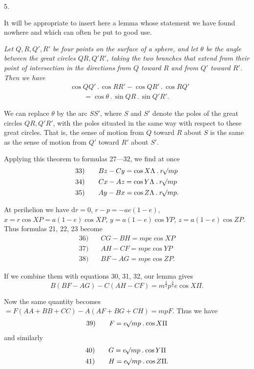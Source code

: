 \par{}\bigskip
{}
\begin{center}5.\end{center}
\noindent\hspace*{\parindent}It will be appropriate to insert here a lemma whose statement we have found nowhere and which can often be put to good use.
\par\textit{Let \(Q,R,Q',R'\) be four points on the surface of a sphere, and let \(\theta\) be the angle between the great circles \(QR,Q'R'\), taking the two branches that extend from their point of intersection in the directions from \(Q\) toward \(R\) and from \(Q'\) toward \(R'\). Then we have}
\[
\begin{aligned}
&\cos QQ'\mathbin{.}\cos RR'-\cos QR'\mathbin{.}\cos RQ'\\
&\qquad=\cos\theta\mathbin{.}\sin QR\mathbin{.}\sin Q'R'.
\end{aligned}
\]
\par We can replace \(\theta\) by the arc \(SS'\), where \(S\) and \(S'\) denote the poles of the great circles \(QR,Q'R'\), with the poles situated in the same way with respect to these great circles. That is, the sense of motion from \(Q\) toward \(R\) about \(S\) is the same as the sense of motion from \(Q'\) toward \(R'\) about \(S'\).
\par Applying this theorem to formulas 27—32, we find at once
\[
\begin{array}{rl}
33)\quad&Bz-Cy=\cos X\Lambda\mathbin{.}r\mathord{{}^{}\!\surd}mp\\[4pt]
34)\quad&Cx-Az=\cos Y\Lambda\mathbin{.}r\mathord{{}^{}\!\surd}mp\\[4pt]
35)\quad&Ay-Bx=\cos Z\Lambda\mathbin{.}r\mathord{{}^{}\!\surd}mp.
\end{array}
\]
\par At perihelion we have \(\mathrm{d}r=0\), \(r-p=-ae(1-e)\), \(x=r\cos XP=a(1-e)\cos XP\), \(y=a(1-e)\cos YP\), \(z=a(1-e)\cos ZP\). Thus formulas 21, 22, 23 become
\[
\begin{array}{rl}
36)\quad&CG-BH=mpe\cos XP\\[4pt]
37)\quad&AH-CF=mpe\cos YP\\[4pt]
38)\quad&BF-AG=mpe\cos ZP.
\end{array}
\]
\par If we combine them with equations 30, 31, 32, our lemma gives
\[
B(BF-AG)-C(AH-CF)=m^{\frac32}p^{\frac32}e\cos X\Pi.
\]
\par Now the same quantity becomes \(=F(AA+BB+CC)-A(AF+BG+CH)=mpF\). Thus we have
\[
\begin{array}{rl}39)\quad&F=e\mathord{{}^{}\!\surd}mp\mathbin{.}\cos X\Pi\end{array}
\]
and similarly
\[
\begin{array}{rl}
40)\quad&G=e\mathord{{}^{}\!\surd}mp\mathbin{.}\cos Y\Pi\\[4pt]
41)\quad&H=e\mathord{{}^{}\!\surd}mp\mathbin{.}\cos Z\Pi.
\end{array}
\]
